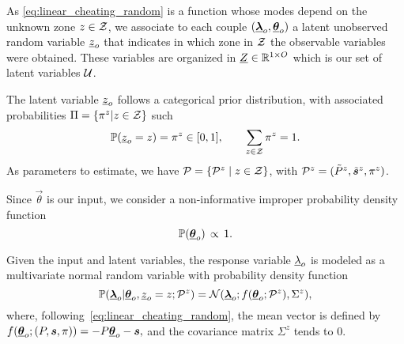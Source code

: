 \documentclass{ifacconf}  %
\begin{document}
As \eqref{eq:linear_cheating_random} is a \pwa{} function whose modes depend on the unknown zone ${z\in\mathcal{Z}}$,
we associate to each couple $(    {\underline{\boldsymbol{\lambda}}}_{o}, {\underline{\boldsymbol{\theta}}}_{o})$ a latent unobserved random variable ${\underline{z}_{o}}$ that indicates in which zone in $\mathcal{Z}$ the observable variables were obtained.
These variables are organized in ${\underline{Z}\in\mathbb{R}^{1\times O}}$ which is our set of latent variables $\mathcal{U}$.

The latent variable $\underline{z}_{o}$ follows a categorical prior distribution, with associated probabilities ${\Pi=\{\pi^{z}|z\in\mathcal{Z}\}}$ such
\[\mathbb{P}(\underline{z}_{o}=z)=\pi^{z} \in [0,1], \qquad \sum_{z\in\mathcal{Z}} \pi^{z} = 1.
\]
As parameters to estimate, we have ${\mathcal{P}=\{\mathcal{P}^{z}\mid z\in\mathcal{Z}\}}$, with ${\mathcal{P}^{z}=(\tilde{P}^{z},\tilde{\boldsymbol{s}}^{z},\pi^{z})}$.

Since $\vec{\theta}$ is our input, we consider a non-informative improper probability density function~\citep{ChristensenEtAl2010}
\[
  \mathbb{P}({\underline{\boldsymbol{\theta}}}_{o}) \,\propto \,1.
\]

Given the input and latent variables, the response variable $\underline{\lambda}_{o}$ is modeled as a multivariate normal random variable with probability density function
\begin{equation}
  \label{eq:multivariate_gaussian}
\mathbb{P}({\underline{\boldsymbol{\lambda}}}_{o}|{\underline{\boldsymbol{\theta}}}_{o},\underline{z}_{o}=z; \mathcal{P}^{z}) = \mathcal{N}({\underline{\boldsymbol{\lambda}}}_{o};f({\underline{\boldsymbol{\theta}}}_{o};\mathcal{P}^{z}),{\Sigma^{z}}),
\end{equation}
where, following~\eqref{eq:linear_cheating_random}, the mean vector is defined by
\({f({\underline{\boldsymbol{\theta}}}_{o};(P,\boldsymbol{s},\pi))=-{P}{\underline{\boldsymbol{\theta}}}_{o}-{\boldsymbol{s}},}\)
and the covariance matrix ${\Sigma^{z}}$ tends to $0$.

\end{document}
